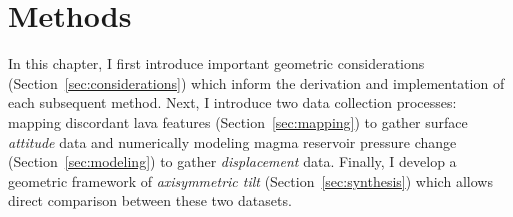 \chapter{Methods}\label{cha:methods}

In this chapter, I first introduce important geometric considerations (Section~\ref{sec:considerations}) which inform the derivation and implementation of each subsequent method. Next, I introduce two data collection processes: mapping discordant lava features (Section~\ref{sec:mapping}) to gather surface \emph{attitude} data and numerically modeling magma reservoir pressure change (Section~\ref{sec:modeling}) to gather \emph{displacement} data. Finally, I develop a geometric framework of \emph{axisymmetric tilt} (Section~\ref{sec:synthesis}) which allows direct comparison between these two datasets.







